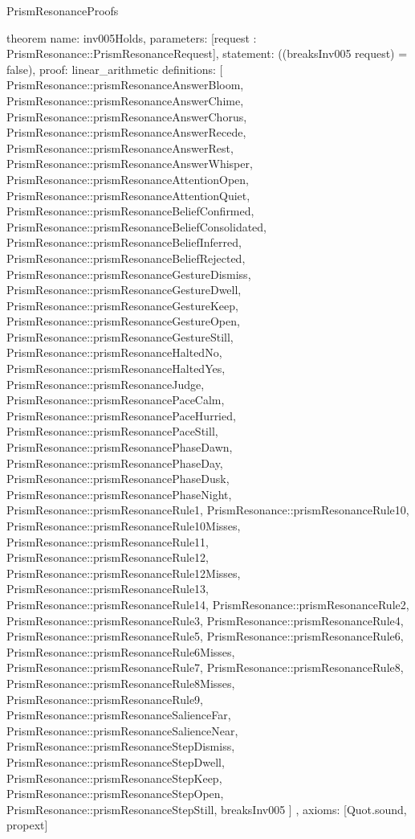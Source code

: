 \begin{lexlean}{PrismResonanceProofs}
\begin{semanticmodule}
theorem{
  name: inv005Holds,
  parameters: [request : PrismResonance::PrismResonanceRequest],
  statement: ((breaksInv005 request) = false),
  proof: linear_arithmetic{
    definitions: [
      PrismResonance::prismResonanceAnswerBloom,
      PrismResonance::prismResonanceAnswerChime,
      PrismResonance::prismResonanceAnswerChorus,
      PrismResonance::prismResonanceAnswerRecede,
      PrismResonance::prismResonanceAnswerRest,
      PrismResonance::prismResonanceAnswerWhisper,
      PrismResonance::prismResonanceAttentionOpen,
      PrismResonance::prismResonanceAttentionQuiet,
      PrismResonance::prismResonanceBeliefConfirmed,
      PrismResonance::prismResonanceBeliefConsolidated,
      PrismResonance::prismResonanceBeliefInferred,
      PrismResonance::prismResonanceBeliefRejected,
      PrismResonance::prismResonanceGestureDismiss,
      PrismResonance::prismResonanceGestureDwell,
      PrismResonance::prismResonanceGestureKeep,
      PrismResonance::prismResonanceGestureOpen,
      PrismResonance::prismResonanceGestureStill,
      PrismResonance::prismResonanceHaltedNo,
      PrismResonance::prismResonanceHaltedYes,
      PrismResonance::prismResonanceJudge,
      PrismResonance::prismResonancePaceCalm,
      PrismResonance::prismResonancePaceHurried,
      PrismResonance::prismResonancePaceStill,
      PrismResonance::prismResonancePhaseDawn,
      PrismResonance::prismResonancePhaseDay,
      PrismResonance::prismResonancePhaseDusk,
      PrismResonance::prismResonancePhaseNight,
      PrismResonance::prismResonanceRule1,
      PrismResonance::prismResonanceRule10,
      PrismResonance::prismResonanceRule10Misses,
      PrismResonance::prismResonanceRule11,
      PrismResonance::prismResonanceRule12,
      PrismResonance::prismResonanceRule12Misses,
      PrismResonance::prismResonanceRule13,
      PrismResonance::prismResonanceRule14,
      PrismResonance::prismResonanceRule2,
      PrismResonance::prismResonanceRule3,
      PrismResonance::prismResonanceRule4,
      PrismResonance::prismResonanceRule5,
      PrismResonance::prismResonanceRule6,
      PrismResonance::prismResonanceRule6Misses,
      PrismResonance::prismResonanceRule7,
      PrismResonance::prismResonanceRule8,
      PrismResonance::prismResonanceRule8Misses,
      PrismResonance::prismResonanceRule9,
      PrismResonance::prismResonanceSalienceFar,
      PrismResonance::prismResonanceSalienceNear,
      PrismResonance::prismResonanceStepDismiss,
      PrismResonance::prismResonanceStepDwell,
      PrismResonance::prismResonanceStepKeep,
      PrismResonance::prismResonanceStepOpen,
      PrismResonance::prismResonanceStepStill,
      breaksInv005
    ]
  },
  axioms: [Quot.sound, propext]
}


\end{semanticmodule}
\end{lexlean}
